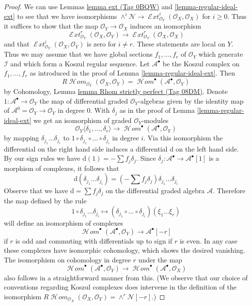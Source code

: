 \documentclass{amsart}
\theoremstyle{plain}
\theoremstyle{definition}
\theoremstyle{remark}
\numberwithin{equation}{subsection}
\def\SheafHom{\mathop{\mathcal{H}\!\mathit{om}}\nolimits}
\def\SheafExt{\mathop{\mathcal{E}\!\mathit{xt}}\nolimits}
\begin{document}
\begin{proof}
We can use Lemmas \href{https://stacks.math.columbia.edu/tag/0BQW}{lemma ext (Tag 0BQW)} and \ref{lemma-regular-ideal-ext}
to see that we have isomorphisms
$\wedge^i\mathcal{N} \to
\SheafExt^i_{\mathcal{O}_Y}(\mathcal{O}_X, \mathcal{O}_X)$
for $i \geq 0$. Thus it suffices to show that the map
$\mathcal{O}_Y \to \mathcal{O}_X$ induces an isomorphism
$$
\SheafExt^r_{\mathcal{O}_Y}(\mathcal{O}_X, \mathcal{O}_Y)
\longrightarrow
\SheafExt^r_{\mathcal{O}_Y}(\mathcal{O}_X, \mathcal{O}_X)
$$
and that
$\SheafExt^i_{\mathcal{O}_Y}(\mathcal{O}_X, \mathcal{O}_Y)$
is zero for $i \not = r$. These statements are local on $Y$. Thus
we may assume that we have global sections $f_1, \ldots, f_r$ of
$\mathcal{O}_Y$ which generate $\mathcal{I}$ and which form a
Koszul regular sequence. Let $\mathcal{A}^\bullet$
be the Koszul complex on $f_1, \ldots, f_r$ as introduced in the proof of
Lemma \ref{lemma-regular-ideal-ext}. Then
$$
R\SheafHom_{\mathcal{O}_Y}(\mathcal{O}_X, \mathcal{O}_Y) =
\SheafHom^\bullet(\mathcal{A}^\bullet, \mathcal{O}_Y)
$$
by Cohomology, Lemma \href{https://stacks.math.columbia.edu/tag/08DM}{lemma Rhom strictly perfect (Tag 08DM)}.
Denote $1 : \mathcal{A}^\bullet \to \mathcal{O}_Y$ the map of differential
graded $\mathcal{O}_Y$-algebras given by the identity map of
$\mathcal{A}^0 = \mathcal{O}_Y \to \mathcal{O}_Y$ in degree $0$.
With $\delta_j$ as in the proof of Lemma \ref{lemma-regular-ideal-ext}
we get an isomorphism of graded $\mathcal{O}_Y$-modules
$$
\mathcal{O}_Y\langle \delta_1, \ldots, \delta_r\rangle
\longrightarrow
\SheafHom^\bullet(\mathcal{A}^\bullet, \mathcal{O}_Y)
$$
by mapping $\delta_{j_1} \ldots \delta_{j_i}$ to
$1 \circ \delta_{j_1} \circ \ldots \circ \delta_{j_i}$ in degree $i$.
Via this isomorphism the differential on the right hand side
induces a differential $\text{d}$ on the left hand side.
By our sign rules we have $\text{d}(1) = - \sum f_j \delta_j$.
Since $\delta_j : \mathcal{A}^\bullet \to \mathcal{A}^\bullet[1]$
is a morphism of complexes, it follows that
$$
\text{d}(\delta_{j_1} \ldots \delta_{j_i}) =
(- \sum f_j \delta_j )\delta_{j_1} \ldots \delta_{j_i}
$$
Observe that we have $\text{d} = \sum f_j \delta_j$ on the differential
graded algebra $\mathcal{A}$. Therefore the map defined by the rule
$$
1 \circ \delta_{j_1} \ldots \delta_{j_i} \longmapsto
(\delta_{j_1} \circ \ldots \circ \delta_{j_i})(\xi_1 \ldots \xi_r)
$$
will define an isomorphism of complexes
$$
\SheafHom^\bullet(\mathcal{A}^\bullet, \mathcal{O}_Y)
\longrightarrow \mathcal{A}^\bullet[-r]
$$
if $r$ is odd and commuting with differentials up to sign if $r$ is even.
In any case these complexes have isomorphic cohomology, which shows the
desired vanishing. The isomorphism on cohomology in degree $r$
under the map
$$
\SheafHom^\bullet(\mathcal{A}^\bullet, \mathcal{O}_Y)
\longrightarrow
\SheafHom^\bullet(\mathcal{A}^\bullet, \mathcal{O}_X)
$$
also follows in a straightforward manner from this.
(We observe that our choice of conventions regarding
Koszul complexes does intervene in the definition
of the isomorphism
$R\SheafHom_{\mathcal{O}_X}(\mathcal{O}_X, \mathcal{O}_Y) =
\wedge^r \mathcal{N}[-r]$.)
\end{proof}
\end{document}
